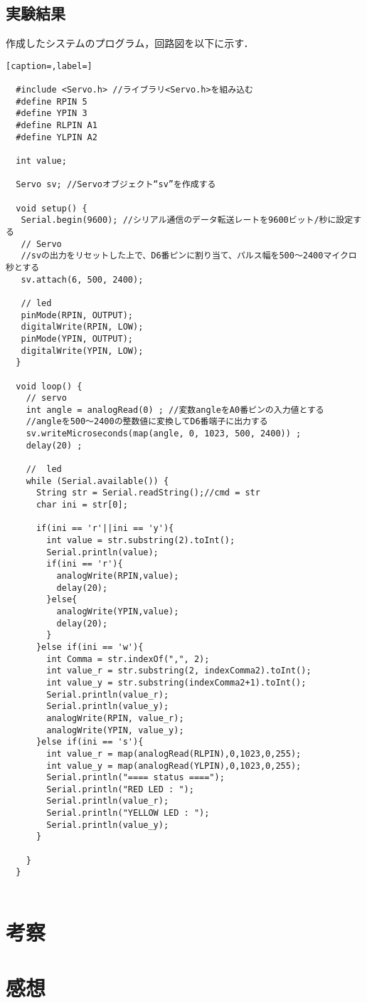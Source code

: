 \documentclass{ltjsarticle}
\begin{document}
\subsection{実験結果}
作成したシステムのプログラム，回路図を以下に示す．
\newpage
\begin{lstlisting}[caption=,label=]
  
  #include <Servo.h> //ライブラリ<Servo.h>を組み込む
  #define RPIN 5
  #define YPIN 3
  #define RLPIN A1
  #define YLPIN A2
  
  int value;
  
  Servo sv; //Servoオブジェクト“sv”を作成する
  
  void setup() {
   Serial.begin(9600); //シリアル通信のデータ転送レートを9600ビット/秒に設定する
   // Servo
   //svの出力をリセットした上で、D6番ピンに割り当て、パルス幅を500～2400マイクロ秒とする
   sv.attach(6, 500, 2400);
   
   // led
   pinMode(RPIN, OUTPUT);
   digitalWrite(RPIN, LOW);
   pinMode(YPIN, OUTPUT);
   digitalWrite(YPIN, LOW);
  }
  
  void loop() {
    // servo
    int angle = analogRead(0) ; //変数angleをA0番ピンの入力値とする
    //angleを500～2400の整数値に変換してD6番端子に出力する
    sv.writeMicroseconds(map(angle, 0, 1023, 500, 2400)) ;
    delay(20) ;
   
    //  led
    while (Serial.available()) {
      String str = Serial.readString();//cmd = str
      char ini = str[0];
  
      if(ini == 'r'||ini == 'y'){
        int value = str.substring(2).toInt();
        Serial.println(value);
        if(ini == 'r'){
          analogWrite(RPIN,value);
          delay(20);
        }else{
          analogWrite(YPIN,value);
          delay(20);
        }
      }else if(ini == 'w'){
        int Comma = str.indexOf(",", 2);
        int value_r = str.substring(2, indexComma2).toInt();
        int value_y = str.substring(indexComma2+1).toInt();
        Serial.println(value_r);
        Serial.println(value_y);
        analogWrite(RPIN, value_r);
        analogWrite(YPIN, value_y);
      }else if(ini == 's'){
        int value_r = map(analogRead(RLPIN),0,1023,0,255);
        int value_y = map(analogRead(YLPIN),0,1023,0,255);
        Serial.println("==== status ====");
        Serial.println("RED LED : ");
        Serial.println(value_r);
        Serial.println("YELLOW LED : ");
        Serial.println(value_y);
      }
      
    }
  }
    
\end{lstlisting}

\section{考察}




\section{感想}

\begin{thebibliography}{9}
\end{thebibliography}
\end{document}
